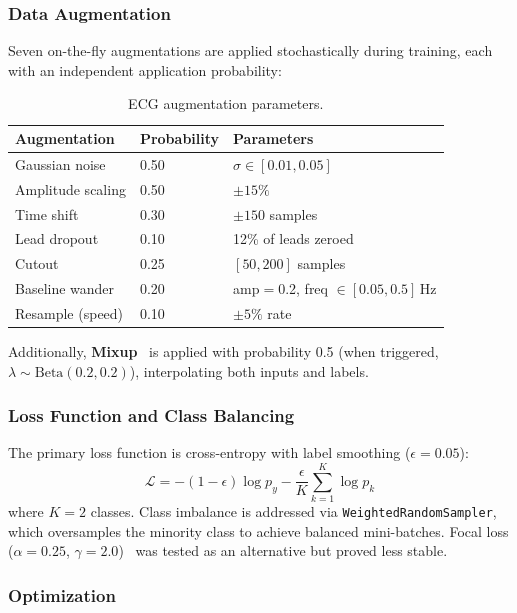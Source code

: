 \documentclass[11pt,a4paper]{article}
\begin{document}
\subsubsection{Data Augmentation}
\label{sec:augmentation}

Seven on-the-fly augmentations are applied stochastically during training, each with an independent application probability:

\begin{table}[H]
\centering
\caption{ECG augmentation parameters.}
\label{tab:augmentations}
\begin{tabular}{lll}
\toprule
\textbf{Augmentation} & \textbf{Probability} & \textbf{Parameters} \\
\midrule
Gaussian noise & 0.50 & $\sigma \in [0.01, 0.05]$ \\
Amplitude scaling & 0.50 & $\pm 15\%$ \\
Time shift & 0.30 & $\pm 150$ samples \\
Lead dropout & 0.10 & 12\% of leads zeroed \\
Cutout & 0.25 & $[50, 200]$ samples \\
Baseline wander & 0.20 & amp$=$0.2, freq $\in [0.05, 0.5]$\,Hz \\
Resample (speed) & 0.10 & $\pm 5\%$ rate \\
\bottomrule
\end{tabular}
\end{table}

Additionally, \textbf{Mixup}~\cite{zhang2018} is applied with probability 0.5 (when triggered, $\lambda \sim \text{Beta}(0.2, 0.2)$), interpolating both inputs and labels.

\subsubsection{Loss Function and Class Balancing}

The primary loss function is cross-entropy with label smoothing ($\epsilon = 0.05$):
\begin{equation}
\mathcal{L} = -(1 - \epsilon) \log p_{y} - \frac{\epsilon}{K} \sum_{k=1}^{K} \log p_k
\end{equation}
where $K{=}2$ classes. Class imbalance is addressed via \texttt{WeightedRandomSampler}, which oversamples the minority class to achieve balanced mini-batches. Focal loss ($\alpha{=}0.25$, $\gamma{=}2.0$)~\cite{lin2017} was tested as an alternative but proved less stable.

\subsubsection{Optimization}
\end{document}
